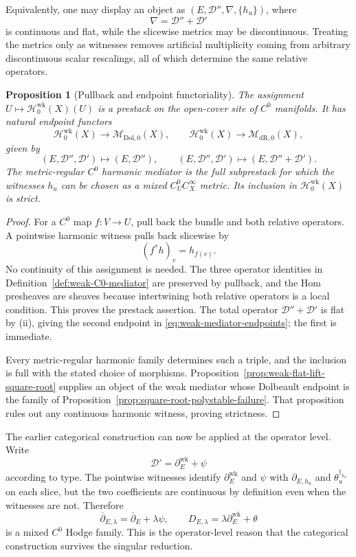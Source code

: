 \documentclass[11pt,reqno]{amsart}
\newtheorem{proposition}[theorem]{Proposition}
\theoremstyle{definition}
\theoremstyle{remark}
\newcommand{\cD}{\mathcal D}
\newcommand{\Dol}{\mathrm{Dol}}
\newcommand{\dR}{\mathrm{dR}}
\newcommand{\ddbar}{\overline\partial}
\begin{document}
Equivalently, one may display an object as $(E,\cD'',\nabla,\{h_u\})$, where
\[
  \nabla=\cD''+\cD'
\]
is continuous and flat, while the slicewise metrics may be discontinuous.  Treating the metrics only as witnesses removes artificial multiplicity coming from arbitrary discontinuous scalar rescalings, all of which determine the same relative operators.

\begin{proposition}[Pullback and endpoint functoriality]\label{prop:weak-mediator-functoriality}
The assignment $U\mapsto\mathscr H^{\mathrm{wk}}_0(X)(U)$ is a prestack on the open-cover site of $C^0$ manifolds.  It has natural endpoint functors
\begin{equation}\label{eq:weak-mediator-endpoints}
  \mathscr H^{\mathrm{wk}}_0(X)
  \longrightarrow \mathscr M_{\Dol,0}(X),
  \qquad
  \mathscr H^{\mathrm{wk}}_0(X)
  \longrightarrow \mathscr M_{\dR,0}(X),
\end{equation}
given by
\[
  (E,\cD'',\cD')\longmapsto(E,\cD''),
  \qquad
  (E,\cD'',\cD')\longmapsto(E,\cD''+\cD').
\]
The metric-regular $C^0$ harmonic mediator is the full subprestack for which the witnesses $h_u$ can be chosen as a mixed $C^0_UC^\infty_X$ metric.  Its inclusion in $\mathscr H^{\mathrm{wk}}_0(X)$ is strict.
\end{proposition}

\begin{proof}
For a $C^0$ map $f:V\to U$, pull back the bundle and both relative operators.  A pointwise harmonic witness pulls back slicewise by
\[
  (f^*h)_v=h_{f(v)}.
\]
No continuity of this assignment is needed.  The three operator identities in Definition~\ref{def:weak-C0-mediator} are preserved by pullback, and the Hom presheaves are sheaves because intertwining both relative operators is a local condition.  This proves the prestack assertion.  The total operator $\cD''+\cD'$ is flat by (ii), giving the second endpoint in \eqref{eq:weak-mediator-endpoints}; the first is immediate.

Every metric-regular harmonic family determines such a triple, and the inclusion is full with the stated choice of morphisms.  Proposition~\ref{prop:weak-flat-lift-square-root} supplies an object of the weak mediator whose Dolbeault endpoint is the family of Proposition~\ref{prop:square-root-polystable-failure}.  That proposition rules out any continuous harmonic witness, proving strictness.
\end{proof}

The earlier categorical construction can now be applied at the operator level.  Write
\[
  \cD'=\partial_E^{\mathrm{wk}}+\psi
\]
according to type.  The pointwise witnesses identify $\partial_E^{\mathrm{wk}}$ and $\psi$ with $\partial_{E,h_u}$ and $\theta_u^{\dagger_{h_u}}$ on each slice, but the two coefficients are continuous by definition even when the witnesses are not.  Therefore
\begin{equation}\label{eq:weak-Hodge-family}
  \ddbar_{E,\lambda}=\ddbar_E+\lambda\psi,
  \qquad
  D_{E,\lambda}=\lambda\partial_E^{\mathrm{wk}}+\theta
\end{equation}
is a mixed $C^0$ Hodge family.  This is the operator-level reason that the categorical construction survives the singular reduction.
\end{document}

